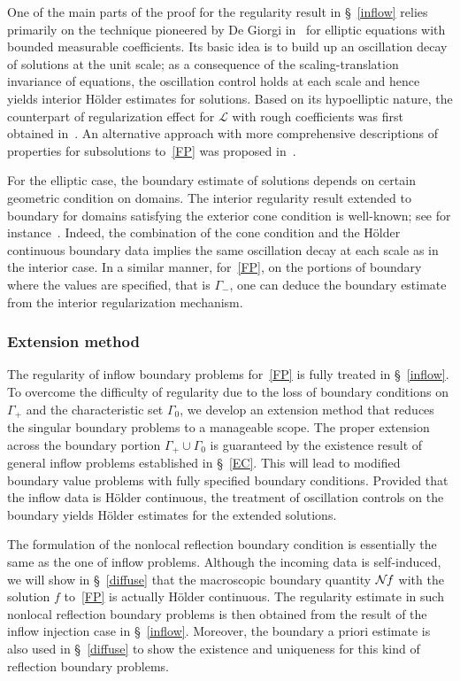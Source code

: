 \documentclass[10pt]{amsart}
\theoremstyle{definition}\newtheorem{defi}[theo]{Definition}\newtheorem{rema}[theo]{Remark}\newtheorem{exam}[theo]{Example}\newtheorem{exem}[theo]{Example}\newtheorem{nota}[theo]{Notation}
\newcommand*\NN {{\mathcal{N}\hspace{-.3mm}}}
\newcommand{\scL}{\mathscr{L}}
\begin{document}
One of the main parts of the proof for the regularity result in \S~\ref{inflow} relies primarily on the technique pioneered by De Giorgi in~\cite{DG} for elliptic equations with bounded measurable coefficients. Its basic idea is to build up an oscillation decay of solutions at the unit scale; as a consequence of the scaling-translation invariance of equations, the oscillation control holds at each scale and hence yields interior H\"older estimates for solutions. Based on its hypoelliptic nature, the counterpart of regularization effect for $\scL$ with rough coefficients was first obtained in~\cite{Zhang}. An alternative approach with more comprehensive descriptions of properties for subsolutions to~\eqref{FP} was proposed in~\cite{GIMV}.

For the elliptic case, the boundary estimate of solutions depends on certain geometric condition on domains. The interior regularity result extended to boundary for domains satisfying the exterior cone condition is well-known; see for instance~\cite{GT}. Indeed, the combination of the cone condition and the H\"older continuous boundary data implies the same oscillation decay at each scale as in the interior case. In a similar manner, for~\eqref{FP}, on the portions of boundary where the values are specified, that is $\Gamma_-$, one can deduce the boundary estimate from the interior regularization mechanism.

\subsubsection{Extension method} 

The regularity of inflow boundary problems for~\eqref{FP} is fully treated in \S~\ref{inflow}. To overcome the difficulty of regularity due to the loss of boundary conditions on $\Gamma_+$ and the characteristic set $\Gamma_0$, we develop an extension method that reduces the singular boundary problems to a manageable scope. The proper extension across the boundary portion $\Gamma_+\cup\Gamma_0$ is guaranteed by the existence result of general inflow problems established in \S~\ref{EC}. This will lead to modified boundary value problems with fully specified boundary conditions. Provided that the inflow data is H\"older continuous, the treatment of oscillation controls on the boundary yields H\"older estimates for the extended solutions.

The formulation of the nonlocal reflection boundary condition is essentially the same as the one of inflow problems. Although the incoming data is self-induced, we will show in \S~\ref{diffuse} that the macroscopic boundary quantity $\NN f$ with the solution $f$ to~\eqref{FP} is actually H\"older continuous. The regularity estimate in such nonlocal reflection boundary problems is then obtained from the result of the inflow injection case in \S~\ref{inflow}. Moreover, the boundary a priori estimate is also used in \S~\ref{diffuse} to show the existence and uniqueness for this kind of reflection boundary problems.
\end{document}
